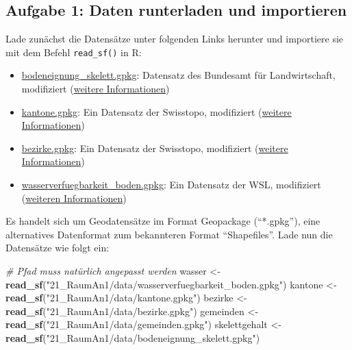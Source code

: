 \documentclass[]{book}
\newenvironment{Shaded}{\begin{snugshade}}{\end{snugshade}}
\newcommand{\CommentTok}[1]{\textcolor[rgb]{0.56,0.35,0.01}{\textit{#1}}}
\newcommand{\KeywordTok}[1]{\textcolor[rgb]{0.13,0.29,0.53}{\textbf{#1}}}
\newcommand{\NormalTok}[1]{#1}
\newcommand{\StringTok}[1]{\textcolor[rgb]{0.31,0.60,0.02}{#1}}
\providecommand{\tightlist}{%
  \setlength{\itemsep}{0pt}\setlength{\parskip}{0pt}}
\begin{document}
\hypertarget{aufgabe-1-daten-runterladen-und-importieren}{%
\subsection{Aufgabe 1: Daten runterladen und importieren}\label{aufgabe-1-daten-runterladen-und-importieren}}

Lade zunächst die Datensätze unter folgenden Links herunter und importiere sie mit dem Befehl \texttt{read\_sf()} in R:

\begin{itemize}
\tightlist
\item
  \href{21_RaumAn1/data/skelettgehalt_proben.gpkg}{bodeneignung\_skelett.gpkg}: Datensatz des Bundesamt für Landwirtschaft, modifiziert (\href{https://www.blw.admin.ch/blw/de/home/politik/datenmanagement/geografisches-informationssystem-gis/download-geodaten.html}{weitere Informationen})
\item
  \href{21_RaumAn1/data/kantone.gpkg}{kantone.gpkg}: Ein Datensatz der Swisstopo, modifiziert (\href{https://shop.swisstopo.admin.ch/de/products/landscape/boundaries3D}{weitere Informationen})
\item
  \href{21_RaumAn1/data/bezirke.gpkg}{bezirke.gpkg}: Ein Datensatz der Swisstopo, modifiziert (\href{https://shop.swisstopo.admin.ch/de/products/landscape/boundaries3D}{weitere Informationen})
\item
  \href{21_RaumAn1/data/wasserverfuegbarkeit_boden.gpkg}{wasserverfuegbarkeit\_boden.gpkg}: Ein Datensatz der WSL, modifiziert (\href{https://www.wsl.ch/de/ueber-die-wsl/programme-und-initiativen/abgeschlossene-programme-und-grossprojekte/wuk.html}{weiteren Informationen})
\end{itemize}

Es handelt sich um Geodatensätze im Format Geopackage (``*.gpkg''), eine alternatives Datenformat zum bekannteren Format ``Shapefiles''. Lade nun die Datensätze wie folgt ein:

\begin{Shaded}
\begin{Highlighting}[]

\CommentTok{# Pfad muss natürlich angepasst werden}
\NormalTok{wasser <-}\StringTok{ }\KeywordTok{read_sf}\NormalTok{(}\StringTok{"21_RaumAn1/data/wasserverfuegbarkeit_boden.gpkg"}\NormalTok{)}
\NormalTok{kantone <-}\StringTok{ }\KeywordTok{read_sf}\NormalTok{(}\StringTok{"21_RaumAn1/data/kantone.gpkg"}\NormalTok{)}
\NormalTok{bezirke <-}\StringTok{ }\KeywordTok{read_sf}\NormalTok{(}\StringTok{"21_RaumAn1/data/bezirke.gpkg"}\NormalTok{) }
\NormalTok{gemeinden <-}\StringTok{ }\KeywordTok{read_sf}\NormalTok{(}\StringTok{"21_RaumAn1/data/gemeinden.gpkg"}\NormalTok{)}
\NormalTok{skelettgehalt <-}\StringTok{ }\KeywordTok{read_sf}\NormalTok{(}\StringTok{"21_RaumAn1/data/bodeneignung_skelett.gpkg"}\NormalTok{)}
\end{Highlighting}
\end{Shaded}
\end{document}
